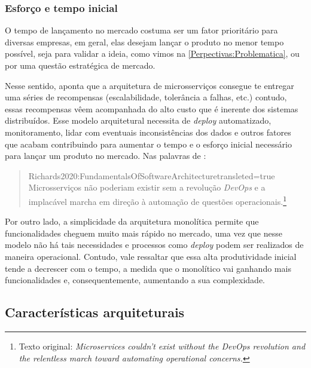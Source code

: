 \subsubsection{Esforço e tempo inicial}

O tempo de lançamento no mercado costuma ser um fator prioritário para diversas empresas, em geral,
elas desejam lançar o produto no menor tempo possível, seja para validar a ideia, como
vimos na \autoref{Perpectivas:Problematica}, ou por uma questão estratégica de mercado.

Nesse sentido,  aponta que a arquitetura de
microsserviços consegue te entregar uma séries de recompensas (escalabilidade, tolerância a falhas,
etc.) contudo, essas recompensas vêem acompanhada do alto custo que é inerente dos sistemas distribuídos.
Esse modelo arquitetural necessita de \textit{deploy} automatizado, monitoramento, lidar com
eventuais inconsistências dos dados e outros fatores que acabam contribuindo para aumentar o tempo e o esforço
inicial necessário para lançar um produto no mercado. Nas palavras de
:

\begin{quotation}{Richards2020:FundamentalsOfSoftwareArchitecture}{transleted=true}
    Microsserviços não poderiam existir sem a revolução \textit{DevOps} e a implacável marcha em direção à
    automação de questões operacionais.\footnote{Texto original: \textit{Microservices couldn't exist
    without the DevOps revolution and the relentless march toward automating operational concerns.}}
\end{quotation}

Por outro lado, a simplicidade da arquitetura monolítica permite que funcionalidades cheguem muito
mais rápido no mercado, uma vez que nesse modelo não há tais necessidades e processos como
\textit{deploy} podem ser realizados de maneira operacional. Contudo, vale ressaltar que essa alta
produtividade inicial tende a decrescer com o tempo, a medida que o monolítico vai ganhando mais
funcionalidades e, consequentemente, aumentando a sua complexidade.

\subsection{Características arquiteturais}


